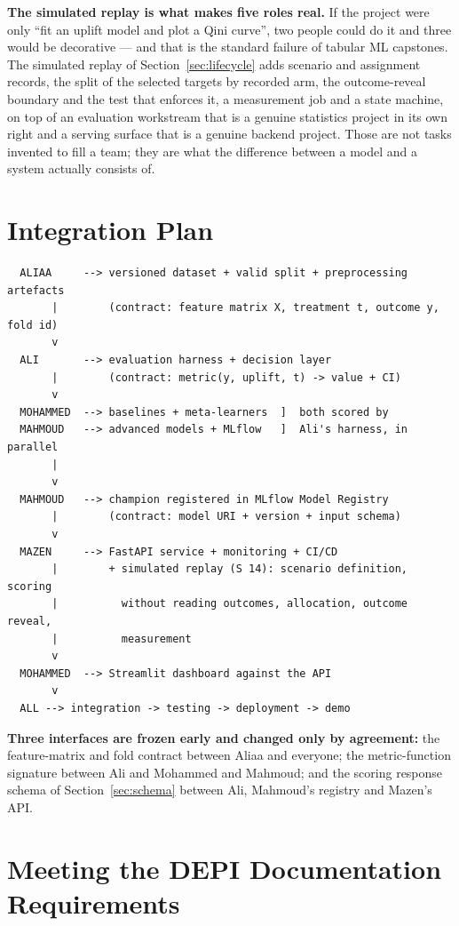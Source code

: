 \documentclass[11pt,a4paper]{article}
\begin{document}
\begin{goodbox}
\textbf{The simulated replay is what makes five roles real.} If the project were only ``fit an
uplift model and plot a Qini curve'', two people could do it and three would be decorative --- and
that is the standard failure of tabular ML capstones. The simulated replay of
Section~\ref{sec:lifecycle} adds scenario and assignment records, the split of the selected
targets by recorded arm, the outcome-reveal boundary and the test that enforces it, a measurement job and a state
machine, on top of an evaluation workstream that is a genuine
statistics project in its own right and a serving surface that is a genuine backend project. Those
are not tasks invented to fill a team; they are what the difference between a model and a system
actually consists of.
\end{goodbox}

\section{Integration Plan}

{\footnotesize
\begin{verbatim}
  ALIAA     --> versioned dataset + valid split + preprocessing artefacts
       |        (contract: feature matrix X, treatment t, outcome y, fold id)
       v
  ALI       --> evaluation harness + decision layer
       |        (contract: metric(y, uplift, t) -> value + CI)
       v
  MOHAMMED  --> baselines + meta-learners  ]  both scored by
  MAHMOUD   --> advanced models + MLflow   ]  Ali's harness, in parallel
       |
       v
  MAHMOUD   --> champion registered in MLflow Model Registry
       |        (contract: model URI + version + input schema)
       v
  MAZEN     --> FastAPI service + monitoring + CI/CD
       |        + simulated replay (S 14): scenario definition, scoring
       |          without reading outcomes, allocation, outcome reveal,
       |          measurement
       v
  MOHAMMED  --> Streamlit dashboard against the API
       v
  ALL --> integration -> testing -> deployment -> demo
\end{verbatim}}

\textbf{Three interfaces are frozen early and changed only by agreement:} the feature-matrix and
fold contract between Aliaa and everyone; the metric-function signature between Ali and
Mohammed and Mahmoud; and the scoring response schema of Section~\ref{sec:schema} between Ali,
Mahmoud's registry and Mazen's API.

\section{Meeting the DEPI Documentation Requirements}
\label{sec:depi-docs}
\end{document}

